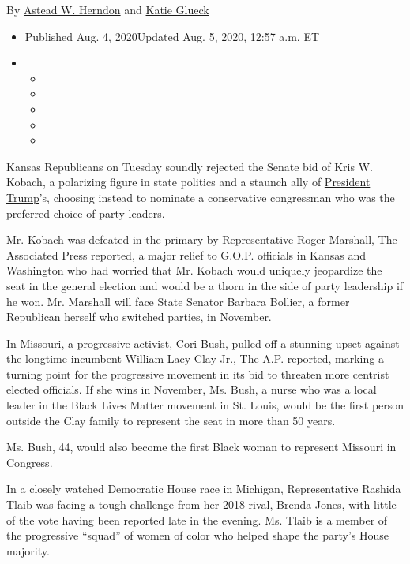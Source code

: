 By \href{https://www.nytimes3xbfgragh.onion/by/astead-w-herndon}{Astead
W. Herndon} and
\href{https://www.nytimes3xbfgragh.onion/by/katie-glueck}{Katie Glueck}

\begin{itemize}
\item
  Published Aug. 4, 2020Updated Aug. 5, 2020, 12:57 a.m. ET
\item
  \begin{itemize}
  \item
  \item
  \item
  \item
  \item
  \end{itemize}
\end{itemize}

Kansas Republicans on Tuesday soundly rejected the Senate bid of Kris W.
Kobach, a polarizing figure in state politics and a staunch ally of
\href{https://www.nytimes3xbfgragh.onion/interactive/2020/us/elections/donald-trump.html}{President
Trump}'s, choosing instead to nominate a conservative congressman who
was the preferred choice of party leaders.

Mr. Kobach was defeated in the primary by Representative Roger Marshall,
The Associated Press reported, a major relief to G.O.P. officials in
Kansas and Washington who had worried that Mr. Kobach would uniquely
jeopardize the seat in the general election and would be a thorn in the
side of party leadership if he won. Mr. Marshall will face State Senator
Barbara Bollier, a former Republican herself who switched parties, in
November.

In Missouri, a progressive activist, Cori Bush,
\href{https://www.nytimes3xbfgragh.onion/2020/08/05/us/politics/cori-bush-missouri-william-lacy-clay.html}{pulled
off a stunning upset} against the longtime incumbent William Lacy Clay
Jr., The A.P. reported, marking a turning point for the progressive
movement in its bid to threaten more centrist elected officials. If she
wins in November, Ms. Bush, a nurse who was a local leader in the Black
Lives Matter movement in St. Louis, would be the first person outside
the Clay family to represent the seat in more than 50 years.

Ms. Bush, 44, would also become the first Black woman to represent
Missouri in Congress.

In a closely watched Democratic House race in Michigan, Representative
Rashida Tlaib was facing a tough challenge from her 2018 rival, Brenda
Jones, with little of the vote having been reported late in the evening.
Ms. Tlaib is a member of the progressive ``squad'' of women of color who
helped shape the party's House majority.

